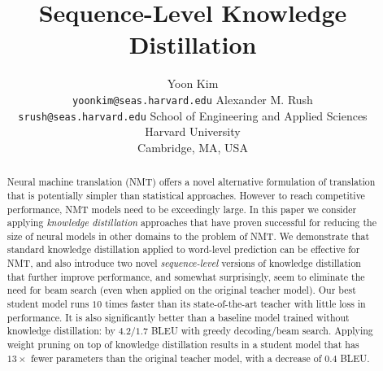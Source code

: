 \documentclass[11pt,letterpaper]{article}
\title{Sequence-Level Knowledge Distillation}
\author{Yoon Kim \\ {\tt yoonkim@seas.harvard.edu} 
\And 
Alexander M. Rush \\ {\tt srush@seas.harvard.edu} 
\AND 
\textnormal{School of Engineering and Applied Sciences} \\
\textnormal{Harvard University} \\
Cambridge, MA, USA  \\
}
\date{}
\begin{document}
\maketitle



\newcommand{\fix}{\marginpar{FIX}}
\newcommand{\new}{\marginpar{NEW}}
\newcommand{\xvec}{\mathbf{x}}
\newcommand{\yvec}{\mathbf{y}}
\newcommand{\cvec}{\mathbf{c}}
\newcommand{\zvec}{\mathbf{z}}
\newcommand{\svec}{\mathbf{s}}
\newcommand{\tvec}{\mathbf{t}}
\newcommand{\mcL}{\mathcal{L}}
\newcommand{\mcT}{\mathcal{T}}
\newcommand{\mcY}{\mathcal{Y}}
\newcommand{\mcV}{\mathcal{V}}
\newcommand{\mcC}{\mathcal{C}}
\newcommand{\mcA}{\mathcal{A}}
\newcommand{\context}{\mathbf{y}_{\mathrm{c}}}
\newcommand{\embcontext}{\mathbf{\tilde{y}}_{\mathrm{c}}}
\newcommand{\inpcontext}{\mathbf{\tilde{x}}}
\newcommand{\start}{\mathbf{\tilde{y}}_{\mathrm{c0}}}
\newcommand{\End}{\mathrm{\texttt{</s>}}}

\newcommand{\Uvec}{\mathbf{U}}
\newcommand{\Evec}{\mathbf{E}}
\newcommand{\Gvec}{\mathbf{G}}
\newcommand{\Fvec}{\mathbf{F}}
\newcommand{\Pvec}{\mathbf{P}}
\newcommand{\pvec}{\mathbf{p}}
\newcommand{\Vvec}{\mathbf{V}}
\newcommand{\Wvec}{\mathbf{W}}
\newcommand{\hvec}{\mathbf{h}}
\newcommand{\wvec}{\mathbf{w}}
\newcommand{\uvec}{\mathbf{u}}
\newcommand{\vvec}{\mathbf{v}}
\newcommand{\bvec}{\mathbf{b}}
\newcommand{\reals}{\mathbb{R}}
\newcommand\given{\,|\,}


\maketitle

\begin{abstract} 
  Neural machine translation (NMT) offers a novel alternative
  formulation of translation that is potentially simpler than
  statistical approaches. However to reach competitive performance,
  NMT models need to be exceedingly large.
  In this paper we consider
  applying \textit{knowledge distillation} approaches 
  \cite{Bucila2006,Hinton2015} that have proven
  successful for reducing the size of neural models in other domains
  to the problem of NMT. We demonstrate that standard knowledge
  distillation applied to word-level prediction can be effective for
  NMT, and also introduce two novel \textit{sequence-level} versions
  of knowledge distillation that further improve performance, and
  somewhat surprisingly, seem to eliminate the need for beam search (even when
  applied on the original teacher model). Our best
  student model runs $10$ times faster than its state-of-the-art teacher with
  little loss in performance. 
  It is also significantly better than a baseline model trained without
   knowledge distillation: by $4.2/1.7$ BLEU with greedy decoding/beam search. 
   Applying weight pruning on top of knowledge distillation results in a student model
   that has $13 \times$ fewer parameters than the original teacher model,
   with a decrease of $0.4$ BLEU.
\end{abstract}
\end{document}
